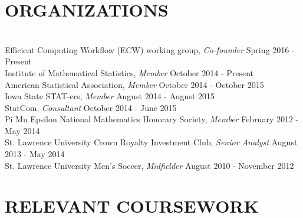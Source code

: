 \documentclass{res} %
\begin{document}
\begin{resume}
\section{ORGANIZATIONS}

\hrulefill \\
Efficient Computing Workflow (ECW) working group, {\sl Co-founder} \dotfill Spring 2016 - Present \\
Institute of Mathematical Statistics, {\sl Member} \dotfill October 2014 - Present \\
American Statistical Association, {\sl Member} \dotfill October 2014 - October 2015 \\
Iowa State STAT-ers, {\sl Member} \dotfill August 2014 - August 2015 \\
StatCom, {\sl Consultant} \dotfill October 2014 - June 2015\\
Pi Mu Epsilon National Mathematics Honorary Society, {\sl Member} \dotfill February 2012 - May 2014 \\
St. Lawrence University Crown Royalty Investment Club, {\sl Senior Analyst} \dotfill August 2013 - May 2014 \\
St. Lawrence University Men's Soccer, {\sl Midfielder} \dotfill August 2010 - November 2012 


\section{RELEVANT COURSEWORK}


\end{resume}
\end{document}
